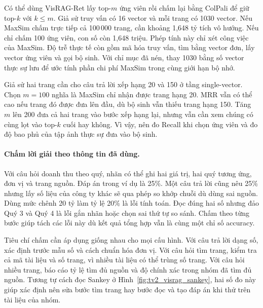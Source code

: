 Có thể dùng VisRAG-Ret lấy top-$m$ ứng viên rồi chấm lại bằng ColPali để
giữ top-$k$ với $k\le m$. Giả sử truy vấn có 16 vector và mỗi trang có
1030 vector. Nếu MaxSim chấm trực tiếp cả 100\,000 trang, cần khoảng
1,648 tỷ tích vô hướng. Nếu chỉ chấm 100 ứng viên, con số còn 1,648
triệu. Phép tính này chỉ xét công việc của MaxSim. Độ trễ thực tế còn
gồm mã hóa truy vấn, tìm bằng vector đơn, lấy vector ứng viên và gọi
bộ sinh. Với chỉ mục đã nén, thay 1030 bằng số vector thực sự lưu để
ước tính phần chi phí MaxSim trong cùng giới hạn bộ nhớ.

Giả sử hai trang cần cho câu trả lời xếp hạng 20 và 150 ở tầng
single-vector. Chọn $m=100$ nghĩa là MaxSim chỉ nhận được trang hạng
20. MRR vẫn có thể cao nếu trang đó được đưa lên đầu, dù bộ sinh
vẫn thiếu trang hạng 150. Tăng $m$ lên 200 đưa cả hai trang vào bước xếp hạng
lại, nhưng vẫn cần xem chúng có cùng lọt vào top-$k$ cuối hay không.
Vì vậy, nên đo Recall khi chọn ứng viên và đo độ bao phủ của tập ảnh
thực sự đưa vào bộ sinh.

\paragraph{Chấm lời giải theo thông tin đã dùng.}
Với câu hỏi doanh thu theo quý, nhãn có thể ghi hai giá trị, hai quý
tương ứng, đơn vị và trang nguồn. Đáp án trong ví dụ là 25\%. Một câu
trả lời cũng nêu 25\% nhưng lấy số liệu của công ty khác sẽ qua phép
so khớp chuỗi dù dùng sai nguồn. Dùng mức chênh 20 tỷ làm tỷ lệ 20\%
là lỗi tính toán. Đọc đúng hai số nhưng đảo Quý 3 và Quý 4 là lỗi gắn
nhãn hoặc chọn sai thứ tự so sánh. Chấm theo từng bước giúp tách các
lỗi này dù kết quả tổng hợp vẫn là cùng một chỉ số accuracy.

Tiêu chí chấm cần áp dụng giống nhau cho mọi cấu hình. Với câu trả lời
dạng số, xác định trước mẫu số và cách chuẩn hóa đơn vị. Với câu hỏi
tìm trang, kiểm tra cả mã tài liệu và số trang, vì nhiều tài liệu có
thể trùng số trang. Với câu hỏi nhiều trang, báo cáo tỷ lệ tìm đủ nguồn
và độ chính xác trong nhóm đã tìm đủ nguồn. Tương tự cách đọc Sankey ở
Hình~\ref{fig:tv2_visrag_sankey}, hai số đo này giúp xác định nên sửa bước
tìm trang hay bước đọc và tạo đáp án khi thử trên tài liệu của nhóm.
